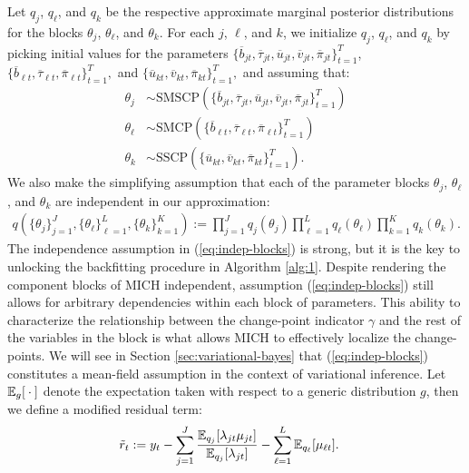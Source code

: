 Let $q_j$, $q_\ell$, and $q_k$ be the respective approximate marginal posterior distributions for the blocks $\theta_j$, $\theta_\ell$, and $\theta_k$. For each $j$, $\ell$, and $k$, we initialize $q_j$, $q_\ell$, and $q_k$ by picking initial values for the parameters $\{\overline{b}_{jt}, \overline{\tau}_{jt}, \overline{u}_{jt}, \overline{v}_{jt}, \overline{\pi}_{jt}\}_{t=1}^T$, $\{\overline{b}_{\ell t}, \overline{\tau}_{\ell t}, \overline{\pi}_{\ell t}\}_{t=1}^T,$ and $\{\overline{u}_{kt}, \overline{v}_{kt}, \overline{\pi}_{kt}\}_{t=1}^T,$ and assuming that:
\begin{align}
    \theta_j &\sim \text{SMSCP}(\{\overline{b}_{jt}, \overline{\tau}_{jt}, \overline{u}_{jt}, \overline{v}_{jt}, \overline{\pi}_{jt}\}_{t=1}^T) \label{eq:q-j}\\
    \theta_\ell &\sim \text{SMCP}(\{\overline{b}_{\ell t}, \overline{\tau}_{\ell t}, \overline{\pi}_{\ell t}\}_{t=1}^T)\\
    \theta_k &\sim \text{SSCP}(\{\overline{u}_{kt}, \overline{v}_{kt}, \overline{\pi}_{kt}\}_{t=1}^T). \label{eq:q-k}
\end{align}
We also make the simplifying assumption that each of the parameter blocks $\theta_j$, $\theta_\ell$, and $\theta_k$ are independent in our approximation:
\begin{align}\label{eq:indep-blocks}
    q(\{\theta_j\}_{j=1}^J, \{\theta_\ell\}_{\ell=1}^L, \{\theta_k\}_{k=1}^K) := \prod_{j=1}^J q_j(\theta_j) \prod_{\ell=1}^L q_\ell(\theta_\ell) \prod_{k=1}^K q_k(\theta_k).
\end{align}
The independence assumption in (\ref{eq:indep-blocks}) is strong, but it is the key to unlocking the backfitting procedure in Algorithm \ref{alg:1}. Despite rendering the component blocks of MICH independent, assumption (\ref{eq:indep-blocks}) still allows for arbitrary dependencies within each block of parameters. This ability to characterize the relationship between the change-point indicator $\gamma$ and the rest of the variables in the block is what allows MICH to effectively localize the change-points. We will see in Section \ref{sec:variational-bayes} that (\ref{eq:indep-blocks}) constitutes a mean-field assumption in the context of variational inference. Let $\mathbb{E}_{g} [\:\cdot\:]$ denote the expectation taken with respect to a generic distribution $g$, then we define a modified residual term:
\begin{align}\label{eq:mod-resid}
    \tilde{r}_t &:= y_t - \sum_{j = 1}^J \frac{\mathbb{E}_{q_j}[\lambda_{jt} \mu_{jt}]}{\mathbb{E}_{q_j}[\lambda_{jt}]}  - \sum_{\ell = 1}^L \mathbb{E}_{q_\ell}[\mu_{\ell t}].
\end{align}
